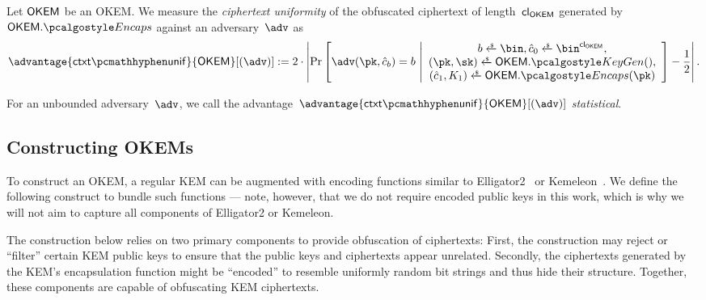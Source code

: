 \begin{definition}
\label{def:ctxt-uniformity}
    Let $\mathsf{OKEM}$ be an OKEM.
    We measure the \emph{ciphertext uniformity} of the obfuscated ciphertext of length~${\mathsf{cl}_{\mathsf{OKEM}}}$ generated by $\OKEM.\encaps$ against an adversary~$\adv$ as
    \[
        \advantage{\ctxtunif}{\OKEM}[(\adv)] := 
        2 \cdot \left|
        \Pr\left[
            \adv(\pk, \hat c_b) = b
        ~\middle|
            \begin{array}{c}
                b \getsr \bin, \hat c_0 \getsr \bin^{\obfctxtlen}, \\
                (\pk,\sk) \getsr \OKEM.\kgen(),\\
                (\hat c_1, K_1) \getsr \OKEM.\encaps(\pk)
            \end{array}
        \right]
        - \frac{1}{2}
        \right|.
    \]
    
    For an unbounded adversary~$\adv$, we call the advantage~$\advantage{\ctxtunif}{\OKEM}[(\adv)] $ \emph{statistical}.
\end{definition}

\subsection{Constructing OKEMs}

To construct an OKEM, a regular KEM can be augmented with encoding functions similar to \textsf{Elligator2}~\cite{CCS:BHKL13} or \textsf{Kemeleon}~\cite[Sec.~2.4]{CCS:GunSteVei24}. We define the following construct to bundle such functions --- note, however, that we do not require encoded public keys in this work, which is why we will not aim to capture all components of \textsf{Elligator2} or \textsf{Kemeleon}.

The construction below relies on two primary components to provide obfuscation of ciphertexts: First, the construction may reject or ``filter'' certain KEM public keys to ensure that the public keys and ciphertexts appear unrelated. Secondly, the ciphertexts generated by the KEM's encapsulation function might be ``encoded'' to resemble uniformly random bit strings and thus hide their structure. Together, these components are capable of obfuscating KEM ciphertexts.

